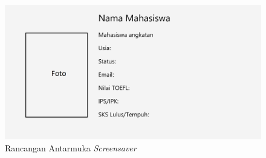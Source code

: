 \begin{figure}[H]
	\centering
	\includegraphics[scale=0.23]{Gambar/UI2.png}
	\caption{Rancangan Antarmuka \textit{Screensaver}}
	\label{fig:4_antarmuka}
\end{figure}